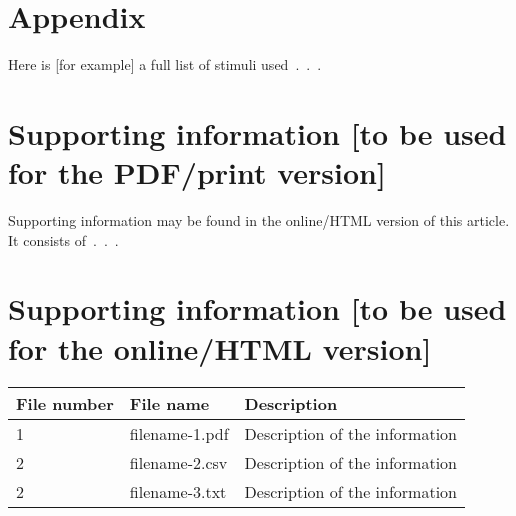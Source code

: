 \documentclass[letterpaper,12pt, twoside]{article}
\begin{document}
 

\section*{Appendix}
\label{sec:appx}
Here is [for example] a full list of stimuli used~.~.~.

\section*{Supporting information [to be used for the PDF/print version]}
\label{sec:suppinfo}

Supporting information may be found in the online/HTML version of this article. It consists of~.~.~.

\section*{Supporting information [to be used for the online/HTML version]}

\begin{tabular}{l l p{4in}}
\hline
File number & File name & Description\\
\hline
1 & filename-1.pdf	& Description of the information\\
2 & filename-2.csv	& Description of the information\\
2 & filename-3.txt	& Description of the information\\
\hline
\end{tabular}

\end{document}
